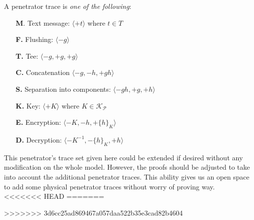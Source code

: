 \begin{Definition} A penetrator trace is \emph{one of the following}:
\begin{itemize}
\item[\textbf{M}.] Text message: $\langle+t\rangle$ where $t \in T$
\item[\textbf{F.}] Flushing: $\langle-g\rangle$ 
\item[\textbf{T.}] Tee: $\langle-g,+g,+g\rangle$
\item[\textbf{C.}] Concatenation $\langle-g,-h,+gh\rangle$
\item[\textbf{S.}] Separation into components: $\langle-gh,+g,+h\rangle$
\item[\textbf{K.}] Key: $\langle+K\rangle$ where $K \in \mathcal{K_P}$
\item[\textbf{E.}] Encryption: $\langle-K,-h,+\{h\}_K\rangle$
\item[\textbf{D.}] Decryption: $\langle-K^{-1},-\{h\}_K,+h\rangle$
\end{itemize} 
\end{Definition}

This penetrator's trace set given here could be extended if desired without any modification on the whole model. However, the proofs should be adjusted to take into account the additional penetrator traces. This ability gives us an open space to add some physical penetrator traces without worry of proving way. 
<<<<<<< HEAD
=======

>>>>>>> 3d6cc25ad869467a057daa522b35e3cad82b4604
